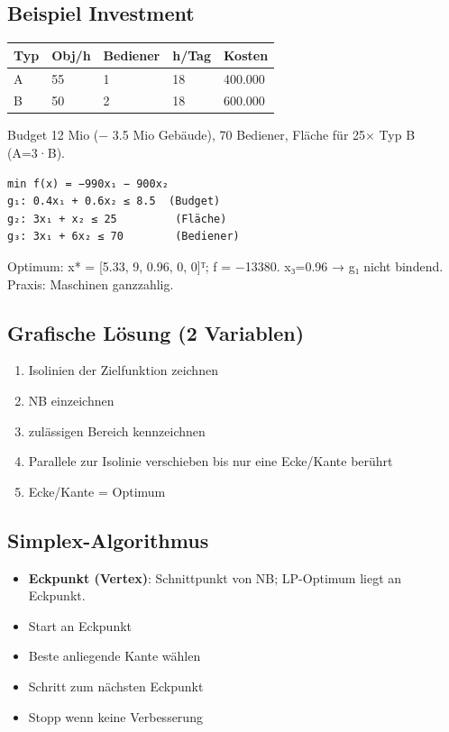 \documentclass[11pt, a4paper]{article}
\begin{document}
\subsection{Beispiel Investment}


{\small
\begin{tabularx}{\linewidth}{XXXXX}
\hline
\rowcolor{tableheadbg}
{\color{white}\textbf{Typ}} & {\color{white}\textbf{Obj/h}} & {\color{white}\textbf{Bediener}} & {\color{white}\textbf{h/Tag}} & {\color{white}\textbf{Kosten}} \\[2pt]
\hline
\endhead
\hline
\endfoot
A & 55 & 1 & 18 & 400.000 \\
B & 50 & 2 & 18 & 600.000 \\
\end{tabularx}
}


Budget 12 Mio (− 3.5 Mio Gebäude), 70 Bediener, Fläche für 25× Typ B (A=3·B).


\begin{lstlisting}
min f(x) = −990x₁ − 900x₂
g₁: 0.4x₁ + 0.6x₂ ≤ 8.5  (Budget)
g₂: 3x₁ + x₂ ≤ 25         (Fläche)
g₃: 3x₁ + 6x₂ ≤ 70        (Bediener)
\end{lstlisting}

Optimum: x* = [5.33, 9, 0.96, 0, 0]ᵀ; f = −13380. x₃=0.96 → g₁ nicht bindend. Praxis: Maschinen ganzzahlig.



\subsection{Grafische Lösung (2 Variablen)}
\begin{enumerate}
  \item Isolinien der Zielfunktion zeichnen
  \item NB einzeichnen
  \item zulässigen Bereich kennzeichnen
  \item Parallele zur Isolinie verschieben bis nur eine Ecke/Kante berührt
  \item Ecke/Kante = Optimum
\end{enumerate}


\subsection{Simplex-Algorithmus}
\begin{itemize}
  \item \textbf{Eckpunkt (Vertex)}: Schnittpunkt von NB; LP-Optimum liegt an Eckpunkt.
  \item Start an Eckpunkt
  \item Beste anliegende Kante wählen
  \item Schritt zum nächsten Eckpunkt
  \item Stopp wenn keine Verbesserung
\end{itemize}
\end{document}
